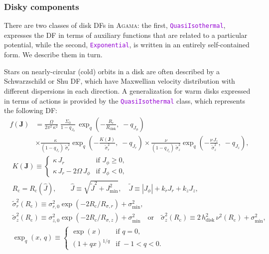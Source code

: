 \documentclass[12pt]{article}
\newcommand{\Agama}{\textsc{Agama}\xspace}
\newcommand{\ttt}[1]{\textcolor{darkviolet}{\texttt{#1}}}
\newcommand{\bJ}{\boldsymbol{J}}
\begin{document}
\subsubsection{Disky components}  \label{sec:DFdisk}

There are two classes of disk DFs in \Agama: the first, \ttt{QuasiIsothermal}, expresses the DF in terms of auxiliary functions that are related to a particular potential, while the second, \ttt{Exponential}, is written in an entirely self-contained form. We describe them in turn.

Stars on nearly-circular (cold) orbits in a disk are often described by a Schwarzschild or Shu DF, which have Maxwellian velocity distribution with different dispersions in each direction. A generalization for warm disks \cite{Dehnen1999} expressed in terms of actions \cite{BinneyMcMillan2011} is provided by the \ttt{QuasiIsothermal} class, which represents the following DF:
\begin{align*}
f(\bJ) &= \frac{\Omega}{2\pi^2\,\kappa^2}\; \frac{\Sigma_0}{1-q_{J_\phi}}\,
\exp_q\left(-\frac{R_\mathrm{c}}{R_\mathrm{disk}},\; -q_{J_\phi}\right) \\  &\times 
\frac{\kappa}{(1-q_{J_r})\;\tilde\sigma_r^2} 
\exp_q\left(-\frac{K(\bJ)}{\tilde\sigma_r^2},\; -q_{J_r}\right) \times
\frac{\nu}   {(1-q_{J_z})\;\tilde\sigma_z^2} 
\exp_q\left(-\frac{\nu\,   J_z}{\tilde\sigma_z^2},\; -q_{J_z}\right),
\end{align*}
\begin{align*}
&K(\bJ) \equiv  \left\{ \begin{array}{ll}
\kappa\,J_r & \mbox{if }J_\phi\ge 0, \\
\kappa\,J_r - 2\Omega\,J_\phi & \mbox{if }J_\phi<0, \end{array} \right.\\
&R_\mathrm{c}=R_\mathrm{c}(\hat J), \qquad \hat J\equiv \sqrt{\tilde J^2 + J_\mathrm{min}^2}, \quad
\tilde J \equiv |J_\phi| + k_r J_r + k_z J_z, \\
&\tilde\sigma_r^2(R_\mathrm{c}) \equiv
\sigma_{r,0}^2 \exp( -2R_\mathrm{c} / R_{\sigma,r} ) + \sigma_\mathrm{min}^2,\\
&\tilde\sigma_z^2(R_\mathrm{c}) \equiv
\sigma_{z,0}^2 \exp( -2R_\mathrm{c} / R_{\sigma,z} )  + \sigma_\mathrm{min}^2  \quad\mbox{or}\quad 
\tilde\sigma_z^2(R_\mathrm{c}) \equiv 
2\,h_\mathrm{disk}^2\,\nu^2(R_\mathrm{c})  + \sigma_\mathrm{min}^2, \\
&\exp_q(x,\, q) \equiv \left\{ \begin{array}{ll}
\exp(x) & \mbox{if }q=0, \\
(1+qx)^{1/q} & \mbox{if }-1<q<0 . \end{array} \right.
\end{align*}
\end{document}
